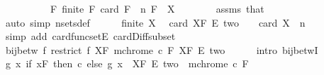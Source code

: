 \begin{isabellebody}
\ \ \isamarkupfalse%
\ {\isacharminus}{\kern0pt}\isanewline
\ \ \ \ \isamarkupfalse%
\ F{\isacharcolon}{\kern0pt}\ {\isachardoublequoteopen}finite\ F{\isachardoublequoteclose}\ {\isachardoublequoteopen}card\ F\ {\isacharequal}{\kern0pt}\ n{\isachardoublequoteclose}\ {\isachardoublequoteopen}F\ {\isasymsubseteq}\ X{\isachardoublequoteclose}\isanewline
\ \ \ \ \ \ \isamarkupfalse%
\ assms\ that\ \isamarkupfalse%
\ {\isacharparenleft}{\kern0pt}auto\ simp{\isacharcolon}{\kern0pt}\ nsets{\isacharunderscore}{\kern0pt}def{\isacharparenright}{\kern0pt}\isanewline
\ \ \ \ \isamarkupfalse%
\ {\isacartoucheopen}finite\ X{\isacartoucheclose}\ \isamarkupfalse%
\ {\isachardoublequoteopen}card\ {\isacharparenleft}{\kern0pt}X{\isacharminus}{\kern0pt}F\ {\isasymrightarrow}\isactrlsub E\ {\isacharquery}{\kern0pt}two{\isacharparenright}{\kern0pt}\ {\isacharequal}{\kern0pt}\ {}\ {\isacharcircum}{\kern0pt}\ {\isacharparenleft}{\kern0pt}card\ X\ {\isacharminus}{\kern0pt}\ n{\isacharparenright}{\kern0pt}{\isachardoublequoteclose}\isanewline
\ \ \ \ \ \ \isamarkupfalse%
\ {\isacharparenleft}{\kern0pt}simp\ add{\isacharcolon}{\kern0pt}\ card{\isacharunderscore}{\kern0pt}funcsetE\ card{\isacharunderscore}{\kern0pt}Diff{\isacharunderscore}{\kern0pt}subset{\isacharparenright}{\kern0pt}\isanewline
\ \ \ \ \isamarkupfalse%
\isanewline
\ \ \ \ \isamarkupfalse%
\ {\isachardoublequoteopen}bij{\isacharunderscore}{\kern0pt}betw\ {\isacharparenleft}{\kern0pt}{\isasymlambda}f{\isachardot}{\kern0pt}\ restrict\ f\ {\isacharparenleft}{\kern0pt}X{\isacharminus}{\kern0pt}F{\isacharparenright}{\kern0pt}{\isacharparenright}{\kern0pt}\ {\isacharparenleft}{\kern0pt}mchrome\ c\ F{\isacharparenright}{\kern0pt}\ {\isacharparenleft}{\kern0pt}X{\isacharminus}{\kern0pt}F\ {\isasymrightarrow}\isactrlsub E\ {\isacharquery}{\kern0pt}two{\isacharparenright}{\kern0pt}{\isachardoublequoteclose}\isanewline
\ \ \ \ \isamarkupfalse%
\ {\isacharparenleft}{\kern0pt}intro\ bij{\isacharunderscore}{\kern0pt}betwI{\isacharparenright}{\kern0pt}\isanewline
\ \ \ \ \ \ \isamarkupfalse%
\ {\isachardoublequoteopen}{\isacharparenleft}{\kern0pt}{\isasymlambda}g\ x{\isachardot}{\kern0pt}\ if\ x{\isasymin}F\ then\ c\ else\ g\ x{\isacharparenright}{\kern0pt}\ {\isasymin}\ {\isacharparenleft}{\kern0pt}X{\isacharminus}{\kern0pt}F\ {\isasymrightarrow}\isactrlsub E\ {\isacharquery}{\kern0pt}two{\isacharparenright}{\kern0pt}\ {\isasymrightarrow}\ mchrome\ c\ F{\isachardoublequoteclose}\isanewline

\end{isabellebody}
